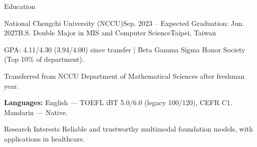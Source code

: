 \documentclass{resume} %
\begin{document}

\begin{rSection}{Education}

\begin{rSubsection}{National Chengchi University (NCCU)}{Sep. 2023 -- Expected Graduation: Jun. 2027}{B.S. Double Major in MIS and Computer Science}{Taipei, Taiwan}
  \item GPA: 4.11/4.30 (3.94/4.00) since transfer | Beta Gamma Sigma Honor Society (Top 10\% of department).
  \item Transferred from NCCU Department of Mathematical Sciences after freshman year.
  \item \textbf{Languages:} English --- TOEFL iBT 5.0/6.0 (legacy 100/120), CEFR C1. Mandarin --- Native.
\end{rSubsection}

\end{rSection}


\begin{rSection}{Research Interests}
Reliable and trustworthy multimodal foundation models, with applications in healthcare.
\end{rSection}

\end{document}
